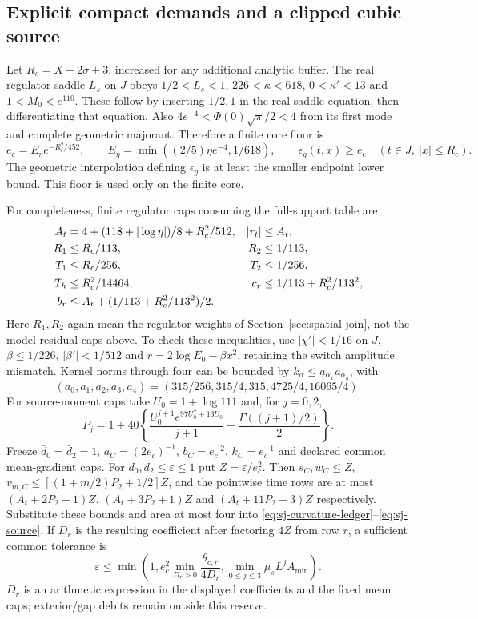 \subsection{Explicit compact demands and a clipped cubic source}
Let $R_c=X+2\sigma+3$, increased for any additional analytic buffer.
The real regulator saddle $L_s$ on $J$ obeys
$1/2<L_s<1$, $226<\kappa<618$, $0<\kappa'<13$ and
$1<M_0<e^{110}$. These follow by inserting $1/2,1$ in the real saddle
equation, then differentiating that equation. Also
$4e^{-4}<\Phi(0)\sqrt\pi/2<4$ from its first mode and complete
geometric majorant. Therefore a finite core floor is
\begin{equation}
 e_c=E_\eta e^{-R_c^2/452},\qquad
 E_\eta=\min((2/5)\eta e^{-4},1/618),\qquad
 \epsilon_g(t,x)\ge e_c\quad(t\in J,\ |x|\le R_c).
 \label{eq:fi-floor}
\end{equation}
The geometric interpolation defining $\epsilon_g$ is at least the
smaller endpoint lower bound. This floor is used only on the finite core.

For completeness, finite regulator caps consuming the full-support table
are
\begin{align}
 A_t&=4+(118+|\log\eta|)/8+R_c^2/512,&|r_t|&\le A_t,\notag\\
 R_1&\le R_c/113,&R_2&\le1/113,\notag\\
 T_1&\le R_c/256,&T_2&\le1/256,\notag\\
 T_h&\le R_c^2/14464,&c_r&\le1/113+R_c^2/113^2,\notag\\
 b_r&\le A_t+(1/113+R_c^2/113^2)/2.
 \label{eq:fi-regulator-caps}
\end{align}
Here $R_1,R_2$ again mean the regulator weights of
Section~\ref{sec:spatial-join}, not the model residual caps above.
To check these inequalities, use $|\chi'|<1/16$ on $J$,
$\beta\le1/226$, $|\beta'|<1/512$ and
$r=2\log E_0-\beta x^2$, retaining the switch amplitude mismatch.
Kernel norms through four can be bounded by
$k_\alpha\le a_{\alpha_x}a_{\alpha_y}$, with
\[
 (a_0,a_1,a_2,a_3,a_4)
   =(315/256,315/4,315,4725/4,16065/4).
\]
For source-moment caps take $U_0=1+\log111$ and, for $j=0,2$,
\[
 P_j=1+40\left\{
  \frac{U_0^{j+1}e^{97U_0^2+13U_0}}{j+1}
                         +\frac{\Gamma((j+1)/2)}2\right\}.
\]
Freeze $\bar d_0=\bar d_2=1$, $a_C=(2e_c)^{-1}$,
$b_C=e_c^{-2}$, $k_C=e_c^{-1}$ and declared common mean-gradient caps.
For $d_0,d_2\le\varepsilon\le1$ put $Z=\varepsilon/e_c^2$.
Then $s_C,w_C\le Z$,
$v_{m,C}\le[(1+m/2)P_2+1/2]Z$, and the pointwise time rows are at
most $(A_t+2P_2+1)Z$, $(A_t+3P_2+1)Z$ and
$(A_t+11P_2+3)Z$ respectively. Substitute these bounds and area at most
four into \eqref{eq:sj-curvature-ledger}--\eqref{eq:sj-source}.
If $D_r$ is the resulting coefficient after factoring $4Z$ from row
$r$, a sufficient common tolerance is
\begin{equation}
 \varepsilon\le\min\left(1,
        e_c^2\min_{D_r>0}\frac{\theta_{c,r}}{4D_r},
        \min_{0\le j\le3}\mu_sL^j A_{\min}\right).
 \label{eq:fi-source-demand}
\end{equation}
$D_r$ is an arithmetic expression in the displayed coefficients and
the fixed mean caps; exterior/gap debits remain outside this reserve.


